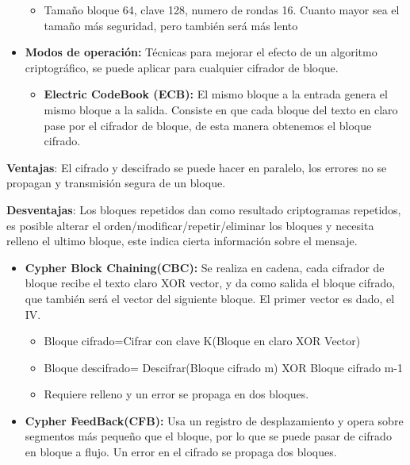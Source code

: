 \documentclass[12pt, twoside, openright]{report} %
\begin{document}
\begin{itemize}
\begin{itemize}
    \item Tamaño bloque 64, clave 128, numero de rondas 16. Cuanto mayor sea
      el tamaño más seguridad, pero también será más lento
      
    \end{itemize}
  \item \textbf{Modos de operación:} Técnicas para mejorar el efecto de un
    algoritmo criptográfico, se puede aplicar para cualquier cifrador de
    bloque.
    

    \begin{itemize}
    \item \textbf{Electric CodeBook (ECB):} El mismo bloque a la entrada
      genera el mismo bloque a la salida. Consiste en que cada bloque
      del texto en claro pase por el cifrador de bloque, de esta manera
      obtenemos el bloque cifrado.
      
    \end{itemize}
  \end{itemize}

  


  \textbf{Ventajas}: El cifrado y descifrado se puede hacer en paralelo,
  los errores no se propagan y transmisión segura de un bloque.

  \textbf{Desventajas}: Los bloques repetidos dan como resultado
  criptogramas repetidos, es posible alterar el
  orden/modificar/repetir/eliminar los bloques y necesita relleno el
  ultimo bloque, este indica cierta información sobre el mensaje.

  \begin{itemize}
  \item \textbf{Cypher Block Chaining(CBC):} Se realiza en cadena, cada
    cifrador de bloque recibe el texto claro XOR vector, y da como
    salida el bloque cifrado, que también será el vector del siguiente
    bloque. El primer vector es dado, el IV.
    

    \begin{itemize}
    \item Bloque cifrado=Cifrar con clave K(Bloque en claro XOR Vector)
      
    \item Bloque descifrado= Descifrar(Bloque cifrado m) XOR Bloque cifrado
      m-1
      
    \item Requiere relleno y un error se propaga en dos bloques.
      
    \end{itemize}
  \item \textbf{Cypher FeedBack(CFB):} Usa un registro de desplazamiento y
    opera sobre segmentos más pequeño que el bloque, por lo que se puede
    pasar de cifrado en bloque a flujo. Un error en el cifrado se
    propaga dos bloques.
    
  \end{itemize}
\end{document}
